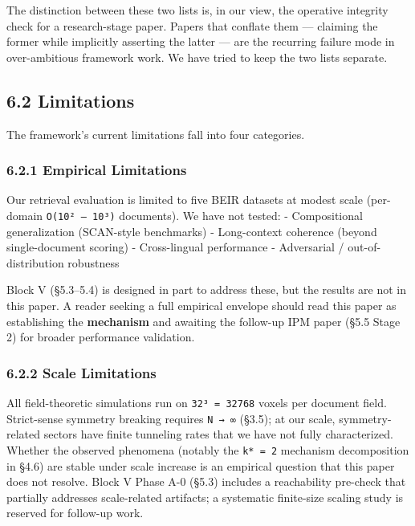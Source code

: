 \documentclass[
]{article}
\begin{document}
The distinction between these two lists is, in our view, the operative
integrity check for a research-stage paper. Papers that conflate them
--- claiming the former while implicitly asserting the latter --- are
the recurring failure mode in over-ambitious framework work. We have
tried to keep the two lists separate.

\hypertarget{limitations}{%
\subsection{6.2 Limitations}\label{limitations}}

The framework's current limitations fall into four categories.

\hypertarget{empirical-limitations}{%
\subsubsection{6.2.1 Empirical
Limitations}\label{empirical-limitations}}

Our retrieval evaluation is limited to five BEIR datasets at modest
scale (per-domain \texttt{O(10²\ –\ 10³)} documents). We have not
tested: - Compositional generalization (SCAN-style benchmarks) -
Long-context coherence (beyond single-document scoring) - Cross-lingual
performance - Adversarial / out-of-distribution robustness

Block V (§5.3--5.4) is designed in part to address these, but the
results are not in this paper. A reader seeking a full empirical
envelope should read this paper as establishing the \textbf{mechanism}
and awaiting the follow-up IPM paper (§5.5 Stage 2) for broader
performance validation.

\hypertarget{scale-limitations}{%
\subsubsection{6.2.2 Scale Limitations}\label{scale-limitations}}

All field-theoretic simulations run on \texttt{32³\ =\ 32768} voxels per
document field. Strict-sense symmetry breaking requires \texttt{N\ →\ ∞}
(§3.5); at our scale, symmetry-related sectors have finite tunneling
rates that we have not fully characterized. Whether the observed
phenomena (notably the \texttt{k*\ =\ 2} mechanism decomposition in
§4.6) are stable under scale increase is an empirical question that this
paper does not resolve. Block V Phase A-0 (§5.3) includes a reachability
pre-check that partially addresses scale-related artifacts; a systematic
finite-size scaling study is reserved for follow-up work.
\end{document}

